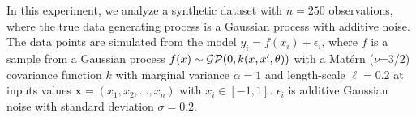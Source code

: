 In this experiment, we analyze a synthetic dataset with $n = 250$ observations, where the true data generating process is a Gaussian process with additive noise. The data points are simulated from the model $y_i = f(x_i) + \epsilon_i$, where $f$ is a sample from a Gaussian process $f(x) \sim \operatorname{\mathcal{GP}}(0, k(x, x', \theta))$ with a Mat{\'e}rn ($\nu$=3/2) covariance function $k$ with marginal variance $\alpha=1$ and length-scale $\ell=0.2$ at inputs values $\bm{x}=(x_1,x_2,\dots,x_n)$ with $x_i \in [-1,1]$. $\epsilon_i$ is additive Gaussian noise with standard deviation $\sigma=0.2$. %
%
% 

